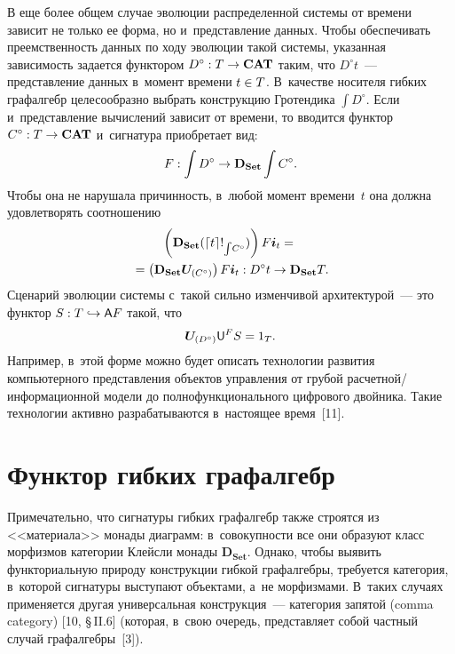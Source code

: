 \begin{multicols}{2}
     В еще более общем случае эволюции распределенной сис\-те\-мы от 
времени зависит не только ее форма, но и~пред\-став\-ле\-ние данных. Чтобы 
обеспечивать преемственность данных по ходу эволюции такой сис\-те\-мы, 
указанная за\-ви\-си\-мость задается функтором $D^\circ : T \hm\to  \mathbf{CAT}$ 
таким, что $D^\circ t$~--- представление данных в~момент времени $t \hm\in T$. 
В~качестве носителя гибких графалгебр целесообразно выбрать конструкцию 
Гротендика $\int D^\circ$. Если и~пред\-став\-ле\-ние вы\-чис\-ле\-ний зависит от 
времени, то вводится функ\-тор $C^\circ : T \hm\to \mathbf{CAT}$ и~сигнатура 
приобретает вид: 
$$
F : \int D^\circ \hm\to \mathbf{D}_{\mathbf{Set}} \int C^\circ.
$$
 Чтобы она 
не нарушала при\-чин\-ность, в~любой момент времени~$t$ она долж\-на 
удовле\-тво\-рять соотношению 
\begin{multline*}
\left(\mathbf{D}_{\mathbf{Set}}(\lceil t\rceil !_{\int\! C^\circ})\right)F{\bm i}_t 
={}\\
{}= \left(\mathbf{D}_{\mathbf{Set}}{\bm U}_{(C^\circ)}\right)F{\bm i}_t : D^\circ t \hm\to  
\mathbf{D}_{\mathbf{Set}}T.
\end{multline*}
 Сценарий эволюции сис\-те\-мы с~такой сильно изменчивой 
архитектурой~--- это функтор $S : T \hm\hookrightarrow \mathsf {A}F$ такой, что 
$$
\bm{U}_{(D^\circ)}\mathsf {U}^FS \hm= 1_T.
$$
 Например, в~этой форме можно будет 
описать технологии развития компьютерного пред\-став\-ле\-ния объектов 
управления от грубой рас\-чет\-ной/ин\-фор\-ма\-ци\-он\-ной модели до 
полнофункционального циф\-ро\-во\-го\- двойника. Такие технологии активно 
разрабатываются в~настоящее время~[11].
     
\section{Функтор гибких графалгебр}

     Примечательно, что сигнатуры гиб\-ких граф\-ал\-гебр также строятся из 
<<материала>> монады диаграмм: в~со\-во\-куп\-ности все они образуют класс 
морфизмов категории Клейсли монады $\mathbf{D}_{\mathbf{Set}}$. \mbox{Однако}, чтобы 
выявить функториальную природу конструкции гиб\-кой графалгебры, требуется 
категория, в~которой сигнатуры выступают объектами, а~не морфизмами. 
В~таких случаях применяется другая универсальная конструкция~--- категория 
запятой (comma category) [10, \S\,II.6] (которая, в~свою очередь, пред\-став\-ля\-ет 
собой част\-ный случай графалгебры~[3]).
     
     \smallskip
     

\end{multicols}
